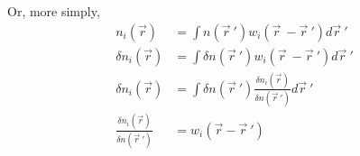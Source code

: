 \documentclass[double,12pt]{revtex4-2}
\begin{document}
Or, more simply,
\begin{align} 
   n_i(\vec r)  &= \int n(\vec r~')w_i(\vec r~-\vec r~')d\vec r~'\\
   \delta n_i(\vec r)  &= \int \delta n(\vec r~')w_i(\vec r~-\vec r~')d\vec r~'\\
   \delta n_i(\vec r)  &= \int \delta n(\vec r~')\frac{\delta n_i(\vec r)}{\delta n(\vec r~')}d\vec r~'\\
   \frac{\delta n_i(\vec r)}{\delta n(\vec r~')}&= w_i(\vec r-\vec r~') 
\end{align}

 
\end{document}
